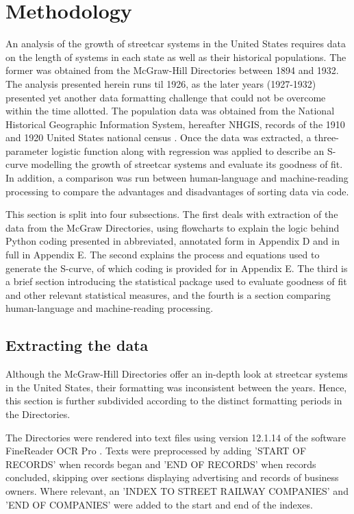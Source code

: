 \newpage
\section{Methodology\label{sec:methods}}

An analysis of the growth of streetcar systems in the United States requires data on the length of systems in each state as well as their historical populations. The former was obtained from the McGraw-Hill Directories between 1894 and 1932. The analysis presented herein runs til 1926, as the later years (1927-1932) presented yet another data formatting challenge that could not be overcome within the time allotted. The population data was obtained from the National Historical Geographic Information System, hereafter NHGIS, records of the 1910 and 1920 United States national census \citep{nhgis}. Once the data was extracted, a three-parameter logistic function along with regression was applied to describe an S-curve modelling the growth of streetcar systems and evaluate its goodness of fit. In addition, a comparison was run between human-language and machine-reading processing to compare the advantages and disadvantages of sorting data via code.

This section is split into four subsections. The first deals with extraction of the data from the McGraw Directories, using flowcharts to explain the logic behind Python coding presented in abbreviated, annotated form in Appendix D and in full in Appendix E. The second explains the process and equations used to generate the S-curve, of which coding is provided for in Appendix E. The third is a brief section introducing the statistical package used to evaluate goodness of fit and other relevant statistical measures, and the fourth is a section comparing human-language and machine-reading processing. 

\subsection{Extracting the data}
Although the McGraw-Hill Directories offer an in-depth look at streetcar systems in the United States, their formatting was inconsistent between the years. Hence, this section is further subdivided according to the distinct formatting periods in the Directories. 

The Directories were rendered into text files using version 12.1.14 of the software FineReader OCR Pro \citep{ocr}. Texts were preprocessed by adding 'START OF RECORDS' when records began and 'END OF RECORDS' when records concluded, skipping over sections displaying advertising and records of business owners. Where relevant, an 'INDEX TO STREET RAILWAY COMPANIES' and 'END OF COMPANIES' were added to the start and end of the indexes.

